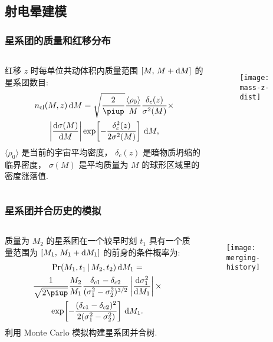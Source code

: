 \documentclass{beamer}
\begin{document}
\subsection{射电晕建模}

\begin{frame}[subsec]
  \frametitle{星系团的质量和红移分布}
  \begin{columns}[onlytextwidth]
    红移 $z$ 时每单位共动体积内质量范围 $[M,\, M+\text{d}M]$ 的星系团数目:
    \begin{multline}
      n_{\R{cl}}(M,z) \,\D{M} =
        \sqrt{\frac{2}{\Cpi}} \frac{\langle \rho_0 \rangle}{M}
        \frac{\delta_c(z)}{\sigma^2(M)} \times \\
        \left| \diff{\sigma(M)}{M} \right|
        \exp\!\left[ -\frac{\delta_c^2(z)}{2\sigma^2(M)} \right]
        \,\D{M} ,
    \end{multline}
    $\langle \rho_0 \rangle$ 是当前的宇宙平均密度，
    $\delta_c(z)$ 是暗物质坍缩的临界密度，
    $\sigma(M)$ 是平均质量为 $M$ 的球形区域里的密度涨落值.

    \begin{figure}
      \centering
      \texttt{[image: mass-z-dist]}
    \end{figure}
  \end{columns}
\end{frame}

\begin{frame}[subsec]
  \frametitle{星系团并合历史的模拟}
  \begin{columns}[onlytextwidth]
    质量为 $M_2$ 的星系团在一个较早时刻 $t_1$ 具有一个质量范围为
    $[M_1,\, M_1+\text{d}M_1]$ 的前身的条件概率为:
    \begin{multline}
      \R{Pr}(M_1, t_1 \,|\, M_2, t_2) \,\D{M_1} = \\
        \frac{1}{\sqrt{2\Cpi}} \frac{M_2}{M_1}
        \frac{\delta_{c1} - \delta_{c2}}{(\sigma_1^2 - \sigma_2^2)^{3/2}}
        \left| \diff{\sigma_1^2}{M_1} \right|
        \times \\
        \exp \!\left[ -\frac{(\delta_{c1} - \delta_{c2})^2}
        {2(\sigma_1^2 - \sigma_2^2)} \right] \,\D{M_1} .
    \end{multline}
    利用 Monte Carlo 模拟构建星系团\alert{并合树}.

    \begin{figure}
      \centering
      \texttt{[image: merging-history]}
    \end{figure}
  \end{columns}
\end{frame}
\end{document}
